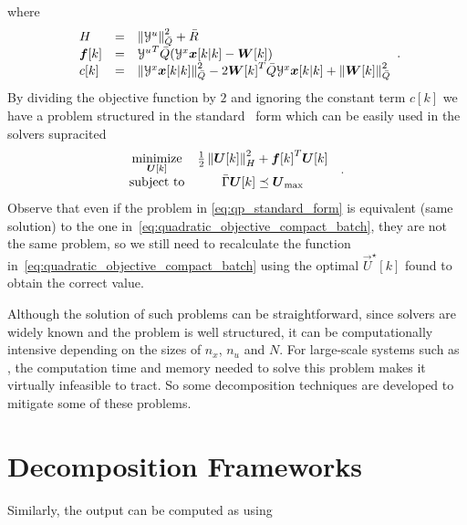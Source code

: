 \documentclass[../main.tex]{subfiles}
\begin{document}
where
\begin{equation}
\begin{array}{lll}
H&=&\left\lVert\mathcal{Y}^{u}\right\rVert^{2}_{\bar{Q}}+\bar{R}\\
\boldsymbol{f}[k]&=&{\mathcal{Y}^{u}}^{T}\bar{Q}(\mathcal{Y}^{x}\boldsymbol{x}[k|k]-\boldsymbol{W}[k])\\
c[k]&=&\left\lVert\mathcal{Y}^{x}\boldsymbol{x}[k|k]\right\rVert^{2}_{\bar{Q}}-2{\boldsymbol{W}[k]}^{T}\bar{Q}{\mathcal{Y}^{x}}\boldsymbol{x}[k|k]+\left\lVert\boldsymbol{W}[k]\right\rVert^{2}_{\bar{Q}}
\end{array}.
\end{equation}
By dividing the objective function by $2$ and ignoring the constant term $c[k]$ we have a problem structured in the standard \qp\ form which can be easily used in the solvers supracited
\begin{equation}
  \label{eq:qp_standard_form}
  \begin{aligned}
    \begin{matrix}
      \underset{\boldsymbol{U}[k]}{\mathrm{minimize}} &
      \frac{1}{2}\left\lVert\boldsymbol{U}[k]\right\rVert^{2}_{H} + {\boldsymbol{f}[k]}^{T}\boldsymbol{U}[k] &\\
      \mathrm{subject~ to} &
\bar{\Gamma}\boldsymbol{U}[k]\preceq {\boldsymbol{U}}_{\text{max}}
    \end{matrix}
  \end{aligned}.
\end{equation}
Observe that even if the problem in \eqref{eq:qp_standard_form} is equivalent (same solution) to the one in~\eqref{eq:quadratic_objective_compact_batch}, they are not the same problem, so we still need to recalculate the function in~\eqref{eq:quadratic_objective_compact_batch} using the optimal $\vec{U}^{\star}[k]$ found to obtain the correct value.

Although the solution of such problems can be straightforward, since solvers are widely known and the problem is well structured, it can be computationally intensive depending on the sizes of $n_{x}$, $n_{u}$ and $N$.
For large-scale systems such as , the computation time and memory needed to solve this problem makes it virtually infeasible to tract. So some decomposition techniques are developed to mitigate some of these problems.

\section{Decomposition Frameworks}
\label{sec:decomp-fram}

Similarly, the output can be computed as using
\end{document}
